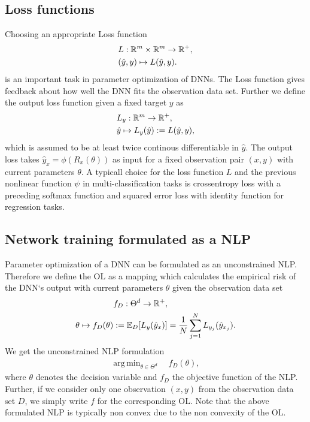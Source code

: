 \documentclass[conference]{IEEEtran}
\DeclareMathOperator*{\argmin}{arg\,min}
\begin{document}
	\subsection{Loss functions}
	\noindent
	Choosing an appropriate Loss function
	\begin{align}
	&L:\mathbb{R}^{m}\times \mathbb{R}^{m}\rightarrow \mathbb{R}^{+}, \notag\\
	&(\hat{y}, y)\mapsto L(\hat{y}, y).
	\end{align}
	is an important task in parameter optimization of DNNs. The Loss function gives feedback about how well the DNN fits the observation data set. Further we define the output loss function given a fixed target $y$ as
	\begin{align}
	&L_{y}:\mathbb{R}^{m}\rightarrow \mathbb{R}^{+}, \notag\\
	&\hat{y}\mapsto L_{y}(\hat{y}) := L(\hat{y}, y),
	\end{align}
	which is assumed to be at least twice continous differentiable in $\hat{y}$. The output loss takes $\hat{y}_{x} = \phi(R_{x}(\theta))$ as input for a fixed observation pair $(x, y)$ with current parameters $\theta$. A typicall choice for the loss function $L$ and the previous nonlinear function $\psi$ in multi-classification tasks is crossentropy loss with a preceding softmax function and squared error loss with identity function for regression tasks.
	
	
	
	\subsection{Network training formulated as a NLP}
	\noindent
	Parameter optimization of a DNN can be formulated as an unconstrained NLP. Therefore we define the OL as a mapping which calculates the empirical risk of the DNN`s output with current parameters $\theta$ given the observation data set
	\begin{align}
	&f_{D}:\Theta^{d}\rightarrow\mathbb{R}^{+}, \notag\\
	\theta\mapsto f_{D}(\theta) &:= \mathbb{E}_{D}[L_{y}(\hat{y}_{x})] =  \frac{1}{N}\sum_{j = 1}^{N}L_{y_{j}}(\hat{y}_{x_{j}}).
	\end{align}
	We get the unconstrained NLP formulation
	\begin{align}
	\argmin_{\theta\in\Theta^{d}}\quad f_{D}(\theta),
	\end{align}
	where $\theta$ denotes the decision variable and $f_{D}$ the objective function of the NLP.
	Further, if we consider only one observation $(x, y)$ from the observation data set $D$, we simply write  $f$ for the corresponding OL. Note that the above formulated NLP is typically non convex due to the non convexity of the OL.
	
\end{document}
